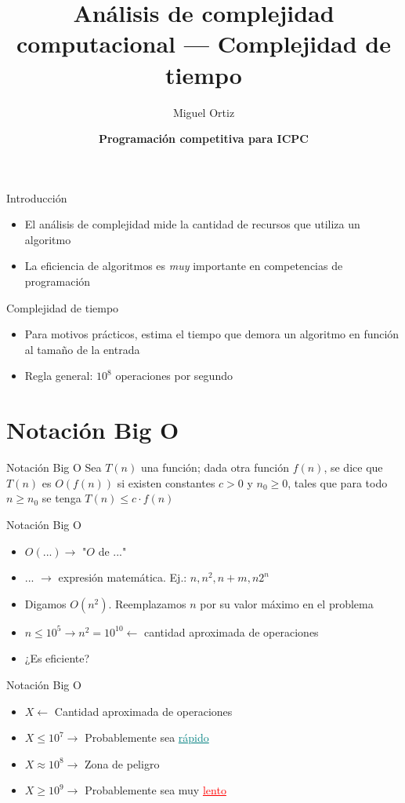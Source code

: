 \documentclass[10pt]{beamer}
\title{Análisis de complejidad computacional --- Complejidad de tiempo}
\author{Miguel Ortiz}
\institute{Abril 2023 - Cochabamba, Bolivia}
\date{\textbf{Programación competitiva para ICPC}}
\newcommand{\bi}{\begin{itemize}}
\newcommand{\ei}{\end{itemize}}
\begin{document}
\maketitle

\begin{frame}{Introducción}
    \bi
        \item El análisis de complejidad mide la cantidad de recursos que utiliza un algoritmo
        \item La eficiencia de algoritmos es \textit{muy} importante en competencias de programación
    \ei
\end{frame}

\begin{frame}{Complejidad de tiempo}
    \bi
        \item Para motivos prácticos, estima el tiempo que demora un algoritmo en función al tamaño de la entrada
        \item Regla general: $10^8$ operaciones por segundo
    \ei
\end{frame}

\section{Notación Big O}

\begin{frame}{Notación Big O}
    Sea $T(n)$ una función; dada otra función $f(n)$, se dice que $T(n)$ es 
    $O(f(n))$ si existen constantes $c > 0$ y $n_0 \geq 0$, tales que para todo $n \geq n_0$ 
    se tenga $T(n) \leq c \cdot f(n)$
\end{frame}

\begin{frame}{Notación Big O}
  \bi
    \item $O(...) \rightarrow$ "$O$ de ..." 
    \item ... $\rightarrow$ expresión matemática. Ej.: $n, n^2, n+m, n2^n$
    \item <2-> Digamos $O(n^2)$. Reemplazamos $n$ por su valor máximo en el problema
    \item <2-> $n \leq 10^5 \rightarrow n^2 = 10^{10} \leftarrow$ cantidad aproximada de operaciones 
    \item <3-> ¿Es eficiente?
  \ei
\end{frame}

\begin{frame}{Notación Big O}
  \bi
    \item $X \leftarrow$ Cantidad aproximada de operaciones
    \vspace{10pt}
    \item $X \leq 10^7 \rightarrow$ Probablemente sea \textcolor{teal}{\underline{rápido}}
    \vspace{10pt}
    \item $X \approx 10^8 \rightarrow$ Zona de peligro
    \vspace{10pt}
    \item $X \geq 10^9 \rightarrow$ Probablemente sea muy \textcolor{red}{\underline{lento}}
  \ei
\end{frame}
\end{document}
